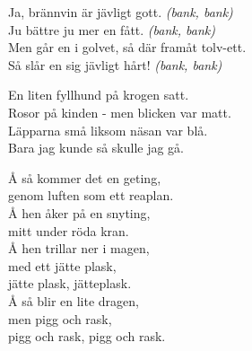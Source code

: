 \documentclass[a6paper, 10pt, twoside]{article}
\begin{document}
\newpage
\noindent
Ja, brännvin är jävligt gott. \textit{(bank, bank)}\\
Ju bättre ju mer en fått. \textit{(bank, bank)}\\
Men går en i golvet, så där framåt tolv-ett. \\
Så slår en sig jävligt hårt! \textit{(bank, bank)}
\vspace{20pt}
\begin{center}
\end{center}
\begin{lyrics}
En liten fyllhund på krogen satt. \\
Rosor på kinden - men blicken var matt. \\
Läpparna små liksom näsan var blå. \\
Bara jag kunde så skulle jag gå. 
\end{lyrics}
\vspace{20pt}
\begin{center}
\end{center}
\begin{lyrics}
Å så kommer det en geting, \\
genom luften som ett reaplan. \\
Å hen åker på en snyting, \\
mitt under röda kran. \\
Å hen trillar ner i magen, \\
med ett jätte plask, \\
jätte plask, jätteplask. \\
Å så blir en lite dragen, \\
men pigg och rask, \\
pigg och rask, pigg och rask. 
\end{lyrics}
\end{document}
